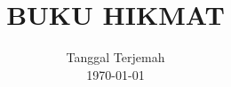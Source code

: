 


%



\pagestyle{empty}
\title{BUKU HIKMAT}
\date{Tanggal Terjemah\\
      \today}
\maketitle


\pagestyle{mystyle}
\setcounter{page}{1}
\ifdefined\theHchapter\else\newcommand\theHchapter{\arabic{chapter}}\fi

